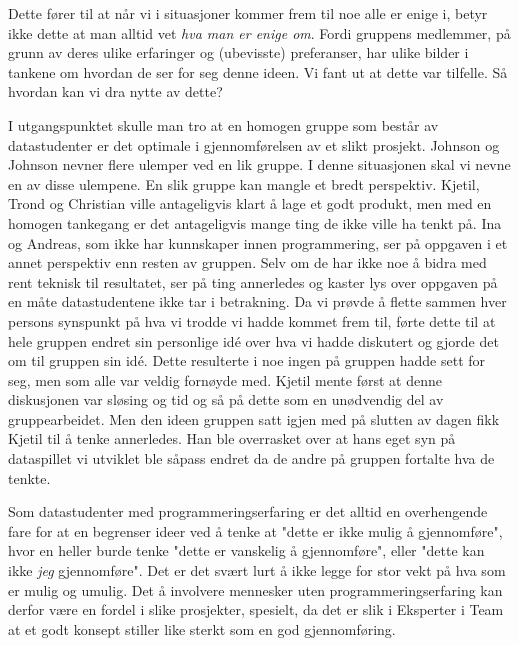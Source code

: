 	Dette fører til at når vi i situasjoner kommer frem til noe alle er enige i, betyr ikke dette at man alltid vet \emph{hva man er enige om}. Fordi gruppens medlemmer, på grunn av deres ulike erfaringer og (ubevisste) preferanser, har ulike bilder i tankene om hvordan de ser for seg denne ideen. Vi fant ut at dette var tilfelle. Så hvordan kan vi dra nytte av dette?

	I utgangspunktet skulle man tro at en homogen gruppe som består av datastudenter er det optimale i gjennomførelsen av et slikt prosjekt. Johnson og Johnson nevner flere ulemper ved en lik gruppe. I denne situasjonen skal vi nevne en av disse ulempene. En slik gruppe kan mangle et bredt perspektiv. Kjetil, Trond og Christian ville antageligvis klart å lage et godt produkt, men med en homogen tankegang er det antageligvis mange ting de ikke ville ha tenkt på. Ina og Andreas, som ikke har kunnskaper innen programmering, ser på oppgaven i et annet perspektiv enn resten av gruppen. Selv om de har ikke noe å bidra med rent teknisk til resultatet, ser på ting annerledes og kaster lys over oppgaven på en måte datastudentene ikke tar i betrakning. Da vi prøvde å flette sammen hver persons synspunkt på hva vi trodde vi hadde kommet frem til, førte dette til at hele gruppen endret sin personlige idé over hva vi hadde diskutert og gjorde det om til gruppen sin idé. Dette resulterte i noe ingen på gruppen hadde sett for seg, men som alle var veldig fornøyde med.  Kjetil mente først at denne diskusjonen var sløsing og tid og så på dette som en unødvendig del av gruppearbeidet. Men den ideen gruppen satt igjen med på slutten av dagen fikk Kjetil til å tenke annerledes. Han ble overrasket over at hans eget syn på dataspillet vi utviklet ble såpass endret da de andre på gruppen fortalte hva de tenkte. 


Som datastudenter med programmeringserfaring er det alltid en overhengende fare for at en begrenser ideer ved å tenke at "dette er ikke mulig å gjennomføre", hvor en heller burde tenke "dette er vanskelig å gjennomføre", eller "dette kan ikke  \emph{jeg} gjennomføre". Det er det svært lurt å ikke legge for stor vekt på hva som er mulig og umulig. Det å involvere mennesker uten programmeringserfaring kan derfor være en fordel i slike prosjekter, spesielt, da det er slik i Eksperter i Team at et godt konsept stiller like sterkt som en god gjennomføring. 


